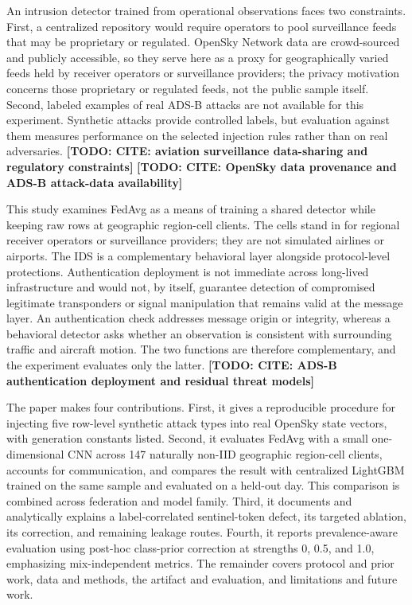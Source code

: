\documentclass[conference]{IEEEtran}
\newcommand{\todo}[1]{\textbf{[TODO: #1]}}
\begin{document}
An intrusion detector trained from operational observations faces two constraints. First, a centralized repository would require operators to pool surveillance feeds that may be proprietary or regulated. OpenSky Network data are crowd-sourced and publicly accessible, so they serve here as a proxy for geographically varied feeds held by receiver operators or surveillance providers; the privacy motivation concerns those proprietary or regulated feeds, not the public sample itself. Second, labeled examples of real ADS-B attacks are not available for this experiment. Synthetic attacks provide controlled labels, but evaluation against them measures performance on the selected injection rules rather than on real adversaries. \todo{CITE: aviation surveillance data-sharing and regulatory constraints} \todo{CITE: OpenSky data provenance and ADS-B attack-data availability}



This study examines FedAvg as a means of training a shared detector while keeping raw rows at geographic region-cell clients. The cells stand in for regional receiver operators or surveillance providers; they are not simulated airlines or airports. The IDS is a complementary behavioral layer alongside protocol-level protections. Authentication deployment is not immediate across long-lived infrastructure and would not, by itself, guarantee detection of compromised legitimate transponders or signal manipulation that remains valid at the message layer. An authentication check addresses message origin or integrity, whereas a behavioral detector asks whether an observation is consistent with surrounding traffic and aircraft motion. The two functions are therefore complementary, and the experiment evaluates only the latter. \todo{CITE: ADS-B authentication deployment and residual threat models}



The paper makes four contributions. First, it gives a reproducible procedure for injecting five row-level synthetic attack types into real OpenSky state vectors, with generation constants listed. Second, it evaluates FedAvg with a small one-dimensional CNN across 147 naturally non-IID geographic region-cell clients, accounts for communication, and compares the result with centralized LightGBM trained on the same sample and evaluated on a held-out day. This comparison is combined across federation and model family. Third, it documents and analytically explains a label-correlated sentinel-token defect, its targeted ablation, its correction, and remaining leakage routes. Fourth, it reports prevalence-aware evaluation using post-hoc class-prior correction at strengths 0, 0.5, and 1.0, emphasizing mix-independent metrics. The remainder covers protocol and prior work, data and methods, the artifact and evaluation, and limitations and future work.
\end{document}
